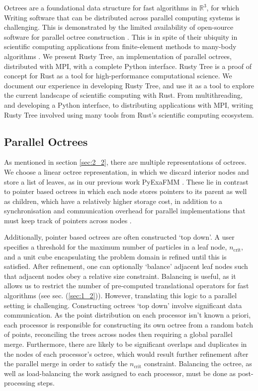 Octrees are a foundational data structure for fast algorithms in $\mathbb{R}^3$, for which Writing software that can be distributed across parallel computing systems is challenging. This is demonstrated by the limited availability of open-source software for parallel octree construction \cite{BursteddeWilcoxGhattas11,fernando2020github}. This is in spite of their ubiquity in scientific computing applications from finite-element methods to many-body algorithms \cite{sundar2008bottom}. We present Rusty Tree, an implementation of parallel octrees, distributed with MPI, with a complete Python interface. Rusty Tree is a proof of concept for Rust as a tool for high-performance computational science. We document our experience in developing Rusty Tree, and use it as a tool to explore the current landscape of scientific computing with Rust. From multithreading, and developing a Python interface, to distributing applications with MPI, writing Rusty Tree involved using many tools from Rust's scientific computing ecosystem. 

\subsection*{Parallel Octrees}

As mentioned in section \ref{sec:2_2}, there are multiple representations of octrees. We choose a linear octree representation, in which we discard interior nodes and store a list of leaves, as in our previous work PyExaFMM \cite{kailasa2022pyexafmm}. These lie in contrast to pointer based octrees in which each node stores pointers to its parent as well as children, which have a relatively higher storage cost, in addition to a synchronisation and communication overhead for parallel implementations that must keep track of pointers across nodes \cite{tu2005scalable}. 

Additionally, pointer based octrees are often constructed `top down'. A user specifies a threshold for the maximum number of particles in a leaf node, $n_{\text{crit}}$, and a unit cube encapsulating the problem domain is refined until this is satisfied. After refinement, one can optionally `balance' adjacent leaf nodes such that adjacent nodes obey a relative size constraint. Balancing is useful, as it allows us to restrict the number of pre-computed translational operators for fast algorithms (see sec. (\ref{sec:1_2})). However, translating this logic to a parallel setting is challenging. Constructing octrees `top down' involve significant data communication. As the point distribution on each processor isn't known a priori, each processor is responsible for constructing its own octree from a random batch of points, reconciling the trees across nodes then requiring a global parallel merge. Furthermore, there are likely to be significant overlaps and duplicates in the nodes of each processor's octree, which would result further refinement after the parallel merge in order to satisfy the $n_{\text{crit}}$ constraint. Balancing the octree, as well as load-balancing the work assigned to each processor, must be done as post-processing steps.

